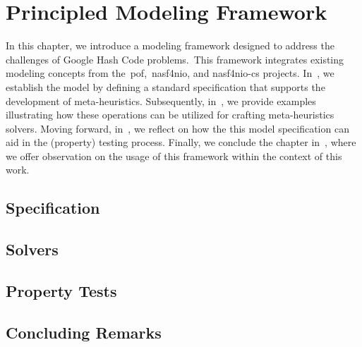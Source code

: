 \chapter{Principled Modeling Framework}
\label{ch:principled-modelling-framework}


In this chapter, we introduce a modeling framework designed to address the
challenges of Google Hash Code problems.~This framework integrates existing
modeling concepts from the~\acrshort{pof},~\acrshort{nasf4nio}, and
\acrshort{nasf4nio-cs} projects. In~, we establish the
model by defining a standard specification that supports the development of
meta-heuristics. Subsequently, in~, we provide examples
illustrating how these operations can be utilized for crafting meta-heuristics
solvers. Moving forward, in~, we reflect on how the this model
specification can aid in the (property) testing process. Finally, we conclude
the chapter in~, where we offer observation on
the usage of this framework within the context of this work.

\section{Specification}
\label{sec:specification}


\section{Solvers}
\label{sec:solver}


\section{Property Tests}
\label{sec:tests}


\section{Concluding Remarks}
\label{sec:pmf-concluding-remarks}

